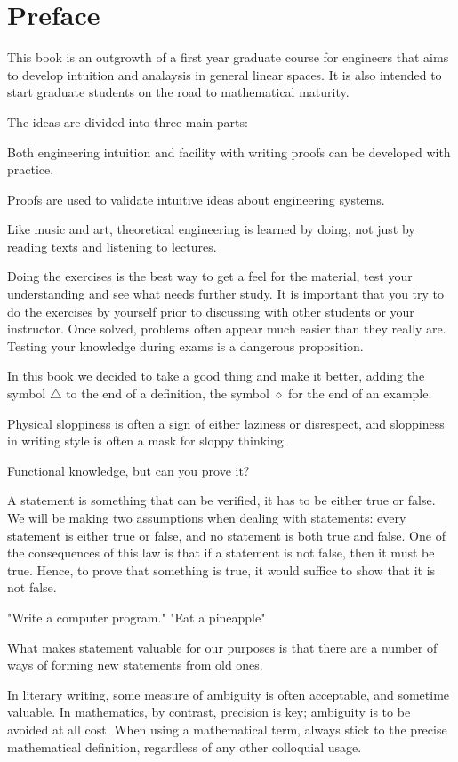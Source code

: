 \chapter*{Preface}

This book is an outgrowth of a first year graduate course for engineers
that aims to develop intuition and analaysis in general linear spaces.
It is also intended to start graduate students on the road to mathematical
maturity.

The ideas are divided into three main parts:

Both engineering intuition and facility with writing proofs can be developed with practice.

Proofs are used to validate intuitive ideas about engineering systems.

Like music and art, theoretical engineering is learned by doing, not just by reading texts and listening to lectures.

Doing the exercises is the best way to get a feel for the material, test your understanding and see what needs further study.
It is important that you try to do the exercises by yourself prior to discussing with other students or your instructor.
Once solved, problems often appear much easier than they really are.
Testing your knowledge during exams is a dangerous proposition.

In this book we decided to take a good thing and make it better, adding the symbol $\triangle$ to the end of a definition, the symbol $\diamond$ for the end of an example.

Physical sloppiness is often a sign of either laziness or disrespect, and sloppiness in writing style is often a mask for sloppy thinking.


Functional knowledge,
but can you prove it?

A statement is something that can be verified, it has to be either true or false.
We will be making two assumptions when dealing with statements: every statement is either true or false, and no statement is both true and false.
One of the consequences of this law is that if a statement is not false, then it must be true.
Hence, to prove that something is true, it would suffice to show that it is not false.

"Write a computer program."
"Eat a pineapple"

What makes statement valuable for our purposes is that there are a number of ways of forming new statements from old ones.

In literary writing, some measure of ambiguity is often acceptable, and sometime valuable.
In mathematics, by contrast, precision is key; ambiguity is to be avoided at all cost.
When using a mathematical term, always stick to the precise mathematical definition, regardless of any other colloquial usage.



